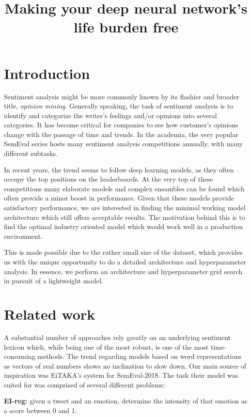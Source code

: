 \documentclass[10pt, a4paper]{article}
\title{Making your deep neural network's life burden free}
\begin{document}
\maketitleabstract

\section{Introduction}

Sentiment analysis might be more commonly known by its flashier and broader title, \textit{opinion mining}. 
Generally speaking, the task of sentiment analysis is to identify and categorize the writer's feelings and/or opinions into several categories. 
It has become critical for companies to see how customer's opinions change with the passage of time and trends. 
In the academia, the very popular SemEval series hosts many sentiment analysis competitions annually, with many different subtasks.

In recent years, the trend seems to follow deep learning models,
as they often occupy the top positions on the leaderboards.
At the very top of these competitions many elaborate models 
and complex ensambles can be found
which often provide a minor boost in performance.
Given that these models provide satisfactory performance,
we are interested in finding the minimal working model architecture
which still offers acceptable results.
The motivation behind this is to find the optimal industry oriented
model which would work well in a production environment.

This is made possible due to the rather small size of the dataset,
which provides us with the unique opportunity to do a detailed
architecture and hyperparameter analysis.
In essence, we perform an architecture and hyperparameter grid
search in pursuit of a lightweight model.

\section{Related work}
A substantial number of approaches rely greatly on an underlying sentiment lexicon \citep{lexicon_paper} which, while being one of the most robust, is one of the most time-consuming methods. The trend regarding models based on word representations as vectors of real numbers \citep{w2v} shows no inclination to slow down. Our main source of inspiration was EiTAKA's system \citep{mohammed-semeval} for SemEval-2018. The task their model was suited for was comprised of several different problems:

\textbf{EI-reg:} given a tweet and an emotion, determine the intensity of that emotion as a score between 0 and 1.
\end{document}
